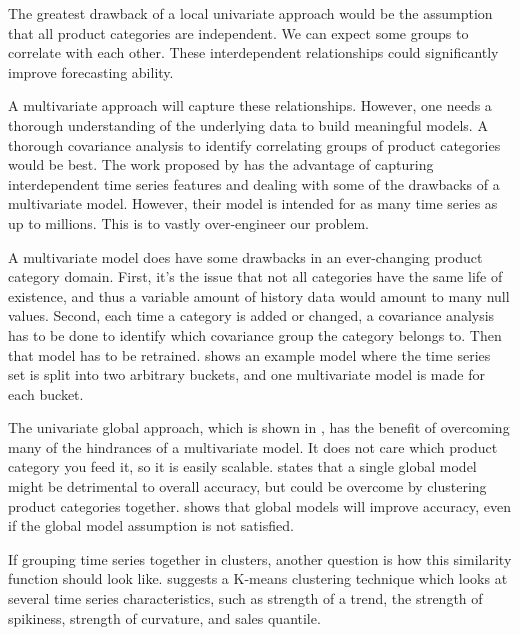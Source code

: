 The greatest drawback of a local univariate approach would be the assumption that all product categories
are independent. We can expect some groups to correlate with each other. These interdependent relationships
could significantly improve forecasting ability.

A multivariate approach will capture these relationships.
However, one needs a thorough understanding of the underlying data to build meaningful models.
A thorough covariance analysis to identify correlating groups of product categories would be best.
The work proposed by \cite{Sen2019} has the advantage of capturing interdependent time series features and dealing with
some of the drawbacks of a multivariate model. However, their model is intended for as many time series as up to millions.
This is to vastly over-engineer our problem.

A multivariate model does have some drawbacks in an ever-changing product category domain.
First, it's the issue that not all categories have the same life of existence, and thus a variable
amount of history data would amount to many null values.
Second, each time a category is added or changed, a covariance analysis has to be done to identify
which covariance group the category belongs to. Then that model has to be retrained.
 shows an example model where the time series set is split into two arbitrary buckets,
and one multivariate model is made for each bucket.

The univariate global approach, which is shown in , has the benefit of overcoming many of the hindrances of a multivariate model.
It does not care which product category you feed it, so it is easily scalable. \cite{Bandara2017}
states that a single global model might be detrimental to overall accuracy, but could be overcome by clustering product categories together.
\cite{Rabanser2020}
shows that global models will improve accuracy, even if the global model assumption is not satisfied.

If grouping time series together in clusters, another question is how this similarity function should look like.
\cite{Bandara2017} suggests a K-means clustering technique
which looks at several time series characteristics, such as
strength of a trend, the strength of spikiness, strength of curvature,
and sales quantile.



